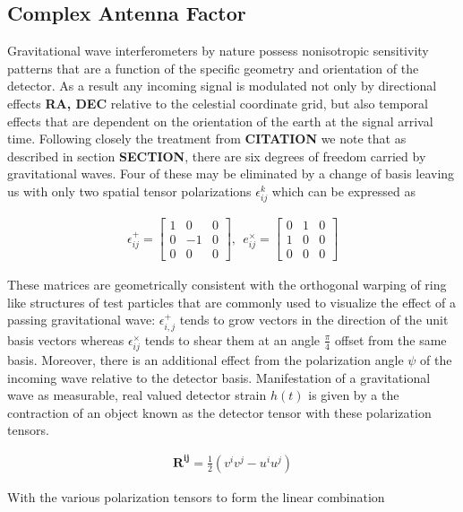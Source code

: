 \documentclass[paper=a4, fontsize=11pt]{scrartcl} %
\numberwithin{equation}{section} %
\numberwithin{figure}{section} %
\numberwithin{table}{section} %
\begin{document}
\subsection{Complex Antenna Factor}
Gravitational wave interferometers by nature possess nonisotropic sensitivity patterns that are a function of the specific geometry and orientation of the detector. As a result any incoming signal is modulated not only by directional effects \textbf{RA, DEC} relative to the celestial coordinate grid, but also temporal effects that are dependent on the orientation of the earth at the signal arrival time. Following closely the treatment from \textbf{CITATION} we note that as described in section \textbf{SECTION}, there are six degrees of freedom carried by gravitational waves. Four of these may be eliminated by a change of basis leaving us with only two spatial tensor polarizations $\epsilon^k_{ij}$ which can be expressed as 

\begin{align}
\epsilon^+_{ij} = 
\begin{bmatrix}
1 & 0 & 0 \\
0 & -1 & 0 \\
0 & 0 & 0
\end{bmatrix}
, \ \ e^{\times}_{ij} =
\begin{bmatrix}
0 & 1 & 0 \\
1 & 0 & 0 \\
0 & 0 & 0
\end{bmatrix}
\end{align}

These matrices are geometrically consistent with the orthogonal warping of ring like structures of test particles that are commonly used to visualize the effect of a passing gravitational wave: $\epsilon^+_{i,j}$ tends to grow vectors in the direction of the unit basis vectors whereas $\epsilon^{\times}_{ij}$ tends to shear them at an angle $\frac{\pi}{4}$ offset from the same basis. Moreover, there is an additional effect from the polarization angle $\psi$ of the incoming wave relative to the detector basis. Manifestation of a gravitational wave as measurable, real valued detector strain $h(t)$ is given by a the contraction of an object known as the detector tensor with these polarization tensors. 

\begin{align}
\mathbf{R^{ij}} = \frac{1}{2}(v^i v^j - u^i u^j)
\end{align}

With the various polarization tensors to form the linear combination 
\end{document}

